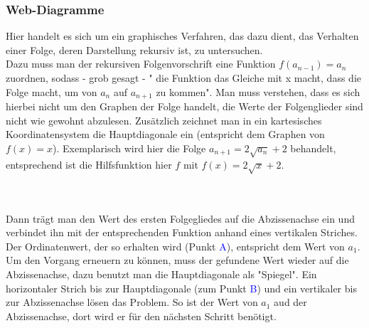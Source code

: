 \subsubsection{Web-Diagramme}
Hier handelt es sich um ein graphisches Verfahren, das dazu dient, das Verhalten einer Folge, deren Darstellung rekursiv ist, zu untersuchen.\\
Dazu muss man der rekursiven Folgenvorschrift eine Funktion $f(a_{n-1})=a_{n}$ zuordnen, sodass - grob gesagt - " die Funktion das Gleiche mit x macht, dass die Folge macht, um von $a_{n}$ auf $a_{n+1}$ zu kommen". Man muss verstehen, dass es sich hierbei nicht um den Graphen der Folge handelt, die Werte der Folgenglieder sind nicht wie gewohnt abzulesen. Zusätzlich zeichnet man in ein kartesisches Koordinatensystem die Hauptdiagonale ein (entspricht dem Graphen von $f(x)=x$).  Exemplarisch wird hier die Folge $a_{n+1}=2\sqrt{a_n}+2$ behandelt, entsprechend ist die Hilfsfunktion hier $f$ mit $f(x)=2\sqrt{x} +2$.\\


\\\\
Dann trägt man den Wert des ersten Folgegliedes auf die Abzissenachse ein und verbindet ihn mit der entsprechenden Funktion anhand eines vertikalen Striches. Der Ordinatenwert, der so erhalten wird (Punkt \textcolor{blue}{A}), entspricht dem Wert von $a_1$. Um den Vorgang erneuern zu können, muss der gefundene Wert wieder auf die Abzissenachse, dazu benutzt man die Hauptdiagonale als "Spiegel". Ein horizontaler Strich bis zur Hauptdiagonale (zum Punkt \textcolor{blue}{B})  und ein vertikaler bis zur Abzissenachse lösen das Problem. So ist der Wert von $a_1$ aud der Abzissenachse, dort wird er für den nächsten Schritt benötigt.


